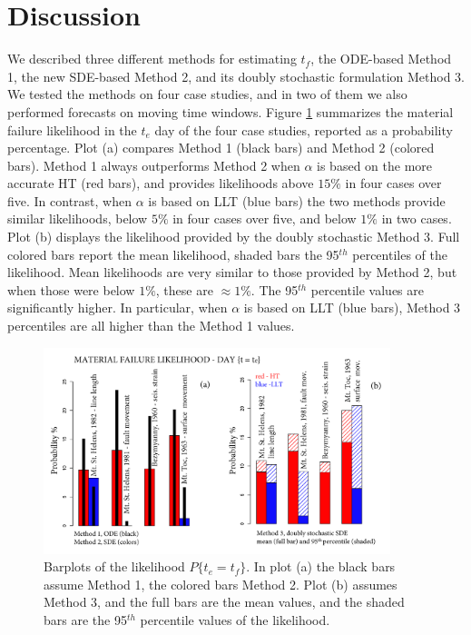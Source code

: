 \documentclass{article}
\begin{document}
\section{Discussion}
We described three different methods for estimating $t_f$, the ODE-based Method 1, the new SDE-based Method 2, and its doubly stochastic formulation Method 3. We tested the methods on four case studies, and in two of them we also performed forecasts on moving time windows. Figure \ref{Fig15} summarizes the material failure likelihood in the $t_e$ day of the four case studies, reported as a probability percentage. Plot (a) compares Method 1 (black bars) and Method 2 (colored bars). Method 1 always outperforms Method 2 when $\alpha$ is based on the more accurate HT (red bars), and provides likelihoods above $15\%$ in four cases over five. In contrast, when $\alpha$ is based on LLT (blue bars) the two methods provide similar likelihoods, below $5\%$ in four cases over five, and below $1\%$ in two cases. Plot (b) displays the likelihood provided by the doubly stochastic Method 3. Full colored bars report the mean likelihood, shaded bars the 95$^{th}$ percentiles of the likelihood. Mean likelihoods are very similar to those provided by Method 2, but when those were below $1\%$, these are $\approx 1\%$. The 95$^{th}$ percentile values are significantly higher. In particular, when $\alpha$ is based on LLT (blue bars), Method 3 percentiles are all higher than the Method 1 values.

\begin{figure}[H]
\centering
\includegraphics[width=0.90\textwidth]{Fig15_plus.png}
\caption{Barplots of the likelihood $P\{t_e=t_f\}$. In plot (a) the black bars assume Method 1, the colored bars Method 2. Plot (b) assumes Method 3, and the full bars are the mean values, and the shaded bars are the 95$^{th}$ percentile values of the likelihood.}
\label{Fig15}
\end{figure}
\end{document}
